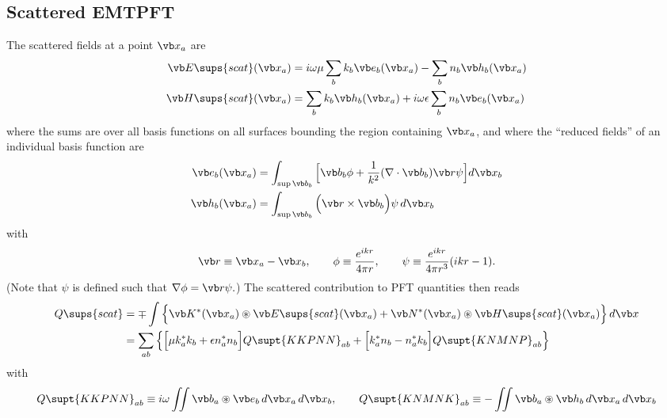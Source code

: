 \subsection{Scattered EMTPFT}

The scattered fields at a point $\vb x_a$ are
\begin{align*}
 \vb E\sups{scat}(\vb x_a)
 &=i\omega \mu \sum_b k_b \vb e_b(\vb x_a) - \sum_b n_b \vb h_b(\vb x_a)
\\
 \vb H\sups{scat}(\vb x_a)
 &=\sum_b k_b \vb h_b(\vb x_a) + i\omega \epsilon \sum_b n_b \vb e_b(\vb x_a)
\end{align*}
where the sums are over all basis functions on all surfaces bounding
the region containing $\vb x_a$, and where the ``reduced fields'' of
an individual basis function are
\begin{align*}
 \vb e_b(\vb x_a)
 &= \int_{\sup \vb b_b}
    \Big[\vb b_b \phi + \frac{1}{k^2}(\nabla \cdot \vb b_b)\vb r \psi \Big]d\vb x_b
\\
 \vb h_b(\vb x_a)
 &= \int_{\sup \vb b_b}
    \Big( \vb r \times \vb b_b \Big) \psi \, d\vb x_b
\end{align*}
with 
$$ \vb r\equiv \vb x_a-\vb x_b, \qquad
  \phi\equiv \frac{e^{ikr}}{4\pi r}, \qquad
  \psi\equiv \frac{e^{ikr}}{4\pi r^3}(ikr-1).
$$
(Note that $\psi$ is defined such that $\nabla \phi = \vb r\psi.$)
The scattered contribution to PFT quantities then reads
\begin{align*}
Q\sups{scat}
&= \mp 
   \int\Big\{
    \vb K^*(\vb x_a) \circledast \vb E\sups{scat}(\vb x_a)
  + \vb N^*(\vb x_a) \circledast \vb H\sups{scat}(\vb x_a)
      \Big\} \, d\vb x
\\
&=\sum_{ab} \Big\{ \Big[\mu k_a^* k_b + \epsilon n_a^* n_b\Big]
                    Q\supt{KKPNN}_{ab}
                  +\Big[k_a^* n_b - n_a^* k_b\Big]
                    Q\supt{KNMNP}_{ab}
            \Big\}
\end{align*}
with
$$
Q\supt{KKPNN}_{ab} 
 \equiv i\omega \iint \vb b_a \circledast \vb e_b \, d\vb x_a \, d\vb x_b,
\qquad
Q\supt{KNMNK}_{ab} 
 \equiv -\iint \vb b_a \circledast \vb h_b \, d\vb x_a \, d\vb x_b
$$
